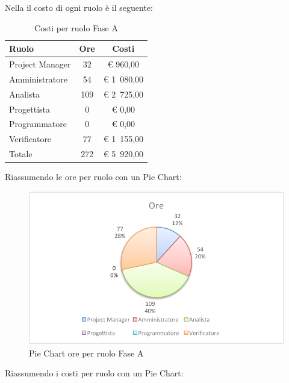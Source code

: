				Nella  il costo di ogni ruolo è il seguente:
				\begin{table}[H]
					\begin{center}
						\begin{tabular}{| l | c | c |}
							\hline
							Ruolo 				& Ore 		& Costi  \\ \hline
							
							Project Manager		& 32 		& \euro{} 960,00 	\\
							Amministratore 		& 54 		& \euro{} 1~080,00 	\\
							Analista	 		& 109 		& \euro{} 2~725,00 	\\
							Progettista 		& 0			& \euro{} 0,00 	\\
							Programmatore		& 0			& \euro{} 0,00	\\
							Verificatore		& 77 		& \euro{} 1~155,00 	\\ \hline \hline
							
							Totale	 			& 272 		& \euro{} 5~920,00 	\\ \hline
						\end{tabular}
					\end{center}
					\caption{Costi per ruolo Fase A}
				\end{table}
				Riassumendo le ore per ruolo con un Pie Chart:
				\begin{figure}[H]\centering
					\includegraphics[width=\textwidth]{PianoDiProgetto/Pics/ChartTotOreFaseA.pdf}
					\caption{Pie Chart ore per ruolo Fase A}
				\end{figure}
				Riassumendo i costi per ruolo con un Pie Chart:
